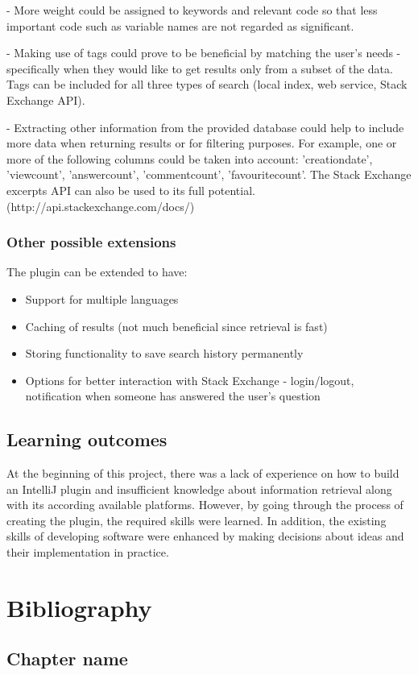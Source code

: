 \documentclass{l4proj}
\begin{document}
- More weight could be assigned to keywords and relevant code so that less important code such as variable names are not regarded as significant. 

- Making use of tags could prove to be beneficial by matching the user's needs - specifically when they would like to get results only from a subset of the data. Tags can be included for all three types of search (local index, web service, Stack Exchange API).

- Extracting other information from the provided database could help to include more data when returning results or for filtering purposes. For example, one or more of the following columns could be taken into account: 'creationdate', 'viewcount', 'answercount', 'commentcount', 'favouritecount'. The Stack Exchange excerpts API can also be used to its full potential. (http://api.stackexchange.com/docs/)

\subsection{Other possible extensions}
The plugin can be extended to have:

\begin{itemize}
\item Support for multiple languages
\item Caching of results (not much beneficial since retrieval is fast)
\item Storing functionality to save search history permanently
\item Options for better interaction with Stack Exchange - login/logout, notification when someone has answered the user's question
\end{itemize}

\section{Learning outcomes}

At the beginning of this project, there was a lack of experience on how to build an IntelliJ plugin and insufficient knowledge about information retrieval along with its according available platforms. However, by going through the process of creating the plugin, the required skills were learned. In addition, the existing skills of developing software were enhanced by making decisions about ideas and their implementation in practice.

\chapter{Bibliography}

\begin{appendices}

\chapter{Chapter name}
\begin{verbatim}
\end{verbatim}

\end{appendices}




\end{document}
